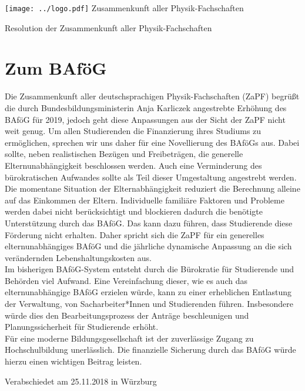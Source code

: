 \documentclass[DIV=calc]{scrartcl}
\begin{document}
    \hspace{0.87\textwidth}
    \begin{minipage}{120pt}
        \vspace{-1.8cm}
        \texttt{[image: ../logo.pdf]}
        \centering
        \small Zusammenkunft aller Physik-Fachschaften
    \end{minipage}
    \begin{center}
        \huge{Resolution der Zusammenkunft aller  Physik-Fachschaften}\vspace{.25\baselineskip}\\
        \normalsize
    \end{center}
    \vspace{1cm}

\section*{Zum BAföG}


Die Zusammenkunft aller deutschsprachigen Physik-Fachschaften (ZaPF) begrüßt die durch
Bundesbildungsministerin Anja Karliczek angestrebte Erhöhung des BAföG für 2019, jedoch geht
diese Anpassungen aus der Sicht der ZaPF nicht weit genug. Um allen Studierenden die
Finanzierung ihres Studiums zu ermöglichen, sprechen wir uns daher für eine Novellierung des
BAföGs aus. Dabei sollte, neben realistischen Bezügen und Freibeträgen, die generelle
Elternunabhängigkeit beschlossen werden. Auch eine Verminderung des bürokratischen Aufwandes
sollte als Teil dieser Umgestaltung angestrebt werden.
\vspace{0.5\baselineskip}\\
Die momentane Situation der Elternabhängigkeit reduziert die Berechnung alleine auf das
Einkommen der Eltern. Individuelle familiäre Faktoren und Probleme werden dabei nicht
berücksichtigt und blockieren dadurch die benötigte Unterstützung durch das BAföG. Das kann
dazu führen, dass Studierende diese Förderung nicht erhalten. Daher spricht sich die ZaPF für ein
generelles elternunabhängiges BAföG
und die jährliche dynamische Anpassung an die sich verändernden
Lebenshaltungskosten aus. 
\vspace{0.5\baselineskip}\\
Im bisherigen BAföG-System entsteht durch die Bürokratie für Studierende und Behörden viel
Aufwand. Eine Vereinfachung dieser, wie es auch das elternunabhängige BAföG erzielen würde,
kann zu einer erheblichen Entlastung der Verwaltung, von Sacharbeiter*Innen und Studierenden
führen. Insbesondere würde dies den Bearbeitungsprozess der Anträge beschleunigen und
Planungssicherheit für Studierende erhöht.
\vspace{0.5\baselineskip}\\
Für eine moderne Bildungsgesellschaft ist der zuverlässige Zugang zu Hochschulbildung
unerlässlich. Die finanzielle Sicherung durch das BAföG würde hierzu einen wichtigen Beitrag
leisten.
\vfill
    \begin{flushright}
        Verabschiedet am 25.11.2018 in Würzburg
    \end{flushright}
\end{document}

